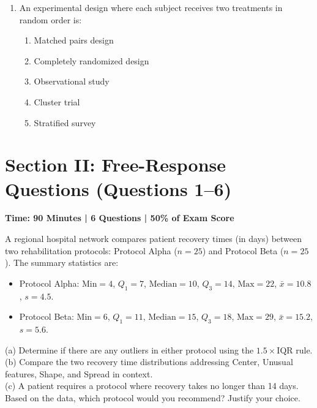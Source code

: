\begin{enumerate}[resume, leftmargin=1.5em]
  \item An experimental design where each subject receives two treatments in random order is:
  \begin{enumerate}[label=(\Alph*)]
    \item Matched pairs design \item Completely randomized design \item Observational study \item Cluster trial \item Stratified survey
  \end{enumerate}
\end{enumerate}

\section{Section II: Free-Response Questions (Questions 1--6)}
\textbf{Time: 90 Minutes | 6 Questions | 50\% of Exam Score}

\begin{workbookbox}
A regional hospital network compares patient recovery times (in days) between two rehabilitation protocols: Protocol Alpha ($n = 25$) and Protocol Beta ($n = 25$). 
The summary statistics are:
\begin{itemize}
  \item Protocol Alpha: $\text{Min} = 4$, $Q_1 = 7$, $\text{Median} = 10$, $Q_3 = 14$, $\text{Max} = 22$, $\bar{x} = 10.8$, $s = 4.5$.
  \item Protocol Beta: $\text{Min} = 6$, $Q_1 = 11$, $\text{Median} = 15$, $Q_3 = 18$, $\text{Max} = 29$, $\bar{x} = 15.2$, $s = 5.6$.
\end{itemize}
(a) Determine if there are any outliers in either protocol using the $1.5 \times \text{IQR}$ rule.\\
(b) Compare the two recovery time distributions addressing Center, Unusual features, Shape, and Spread in context.\\
(c) A patient requires a protocol where recovery takes no longer than 14 days. Based on the data, which protocol would you recommend? Justify your choice.
\end{workbookbox}

